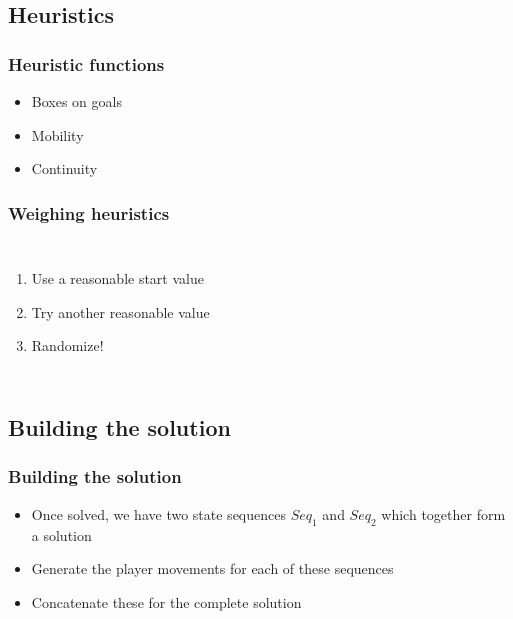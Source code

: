 \documentclass[]{beamer}
\begin{document}
\subsection{Heuristics}
\begin{frame}
	\frametitle{Heuristic functions}
	\begin{itemize}
		\item{Boxes on goals}
		\item{Mobility}
		\item{Continuity}
	\end{itemize}
\end{frame}

\begin{frame}
	\frametitle{Weighing heuristics}
	\begin{columns}
	\begin{enumerate}
		\item{Use a reasonable start value}
		\item{Try another reasonable value}
		\item{Randomize!}
	\end{enumerate}
	\end{columns}
\end{frame}

\subsection{Building the solution}
\begin{frame}
	\frametitle{Building the solution}
	\begin{itemize}
		\item{Once solved, we have two state sequences $Seq_1$ and $Seq_2$ which together form a solution}
		\item{Generate the player movements for each of these sequences}
		\item{Concatenate these for the complete solution}
	\end{itemize}
\end{frame}
\end{document}
